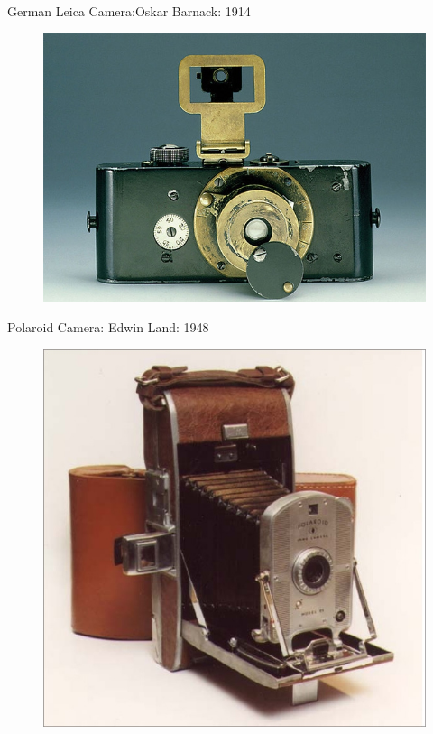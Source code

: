 \documentclass{beamer}
\begin{document}
	\begin{frame}{German Leica Camera:Oskar Barnack: 1914}
		\begin{figure}
			\centering
			\includegraphics[scale=0.4]{129.jpg}
		\end{figure}
	\end{frame}
	\begin{frame}{Polaroid Camera: Edwin Land: 1948}
		\begin{figure}
			\centering
			\includegraphics[scale=0.3]{130.jpg}
		\end{figure}
	\end{frame}
\end{document}
